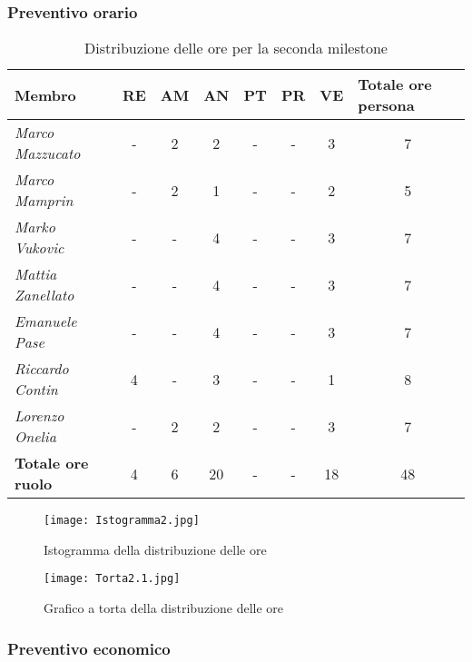 \subsubsection{Preventivo orario}

\begin{table}[!ht]
    \centering
    \begin{tabular}{|l|c|c|c|c|c|c|c|}
    \hline
    \textbf{Membro} & \multicolumn{1}{l|}{\textbf{RE}} & \multicolumn{1}{l|}{\textbf{AM}} & \multicolumn{1}{l|}{\textbf{AN}} & \multicolumn{1}{l|}{\textbf{PT}} & \multicolumn{1}{l|}{\textbf{PR}} & \multicolumn{1}{l|}{\textbf{VE}} & \multicolumn{1}{l|}{\textbf{Totale ore persona}} \\ \hline
    \textit{Marco Mazzucato}  & - & 2  & 2  & - & - & 3  & 7  \\ \hline
    \textit{Marco Mamprin}    & - & 2  & 1  & - & - & 2  & 5  \\ \hline
    \textit{Marko Vukovic}    & - & -  & 4  & - & - & 3  & 7  \\ \hline
    \textit{Mattia Zanellato} & - & -  & 4  & - & - & 3  & 7  \\ \hline
    \textit{Emanuele Pase}    & - & -  & 4  & - & - & 3  & 7  \\ \hline
    \textit{Riccardo Contin}  & 4 & -  & 3  & - & - & 1  & 8  \\ \hline
    \textit{Lorenzo Onelia}   & - & 2  & 2  & - & - & 3  & 7  \\ \hline
    \textbf{Totale ore ruolo} & 4 & 6  & 20 & - & - & 18 & 48 \\ \hline
    \end{tabular}
    \caption{Distribuzione delle ore per la seconda milestone}
\end{table}

\begin{figure}[!ht]
    \texttt{[image: Istogramma2.jpg]}
    \caption{Istogramma della distribuzione delle ore} 
\end{figure}

\begin{figure}[!ht]
    \texttt{[image: Torta2.1.jpg]}
    \caption{Grafico a torta della distribuzione delle ore} 
\end{figure}

\newpage
\subsubsection{Preventivo economico}

